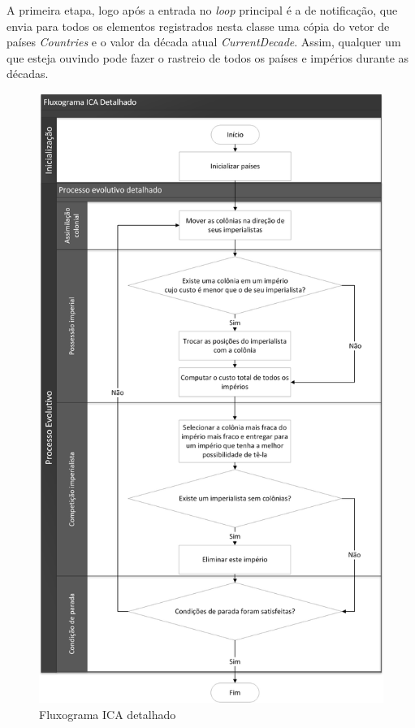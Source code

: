 	A primeira etapa, logo após a entrada no \emph{loop} principal é a de notificação, que envia para todos os elementos registrados nesta classe uma cópia do vetor de países \emph{Countries} e o valor da década atual \emph{CurrentDecade}. Assim, qualquer um que esteja ouvindo pode fazer o rastreio de todos os países e impérios durante as décadas.

 \begin{figure}[h]
	\centering	
	\includegraphics[scale=0.5]{Figuras/Fluxograms-ICACanocicDetailed.png}
	\caption{Fluxograma ICA detalhado}
	\label{fig:Fluxograms-ICACanocicDetailed}
	\end{figure}
	
